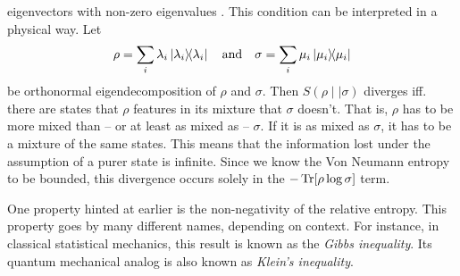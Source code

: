 eigenvectors with non-zero eigenvalues
\cite{leditzkyRelativeEntropiesTheir2016,schumacherRelativeEntropyQuantum2000}.
This condition can be interpreted in a physical way. Let
\[
  \rho = \sum_i \lambda_i \dyad{\lambda_i} \quad{\text{and}} \quad
  \sigma = \sum_i \mu_i \dyad{\mu_i}
\]
be orthonormal eigendecomposition of $\rho$ and $\sigma$.
Then $S(\rho\mid\mid\sigma)$ diverges iff. there are states that $\rho$
features in its mixture that $\sigma$ doesn't. That is, $\rho$ has to be more
mixed than -- or at least as mixed as -- $\sigma$. If it is as mixed as
$\sigma$, it has to be a mixture of the same states. This means that the
information lost under the assumption of a purer state is infinite.
Since we know the Von Neumann entropy to be bounded, this divergence occurs
solely in the $-\Tr[\rho\log\sigma]$ term. 

One property hinted at earlier is the non-negativity of the relative entropy.
This property goes by many different names, depending on context. For instance,
in classical statistical mechanics, this result is known as the \emph{Gibbs
inequality}. Its quantum mechanical analog is also known as \emph{Klein's
inequality}.
